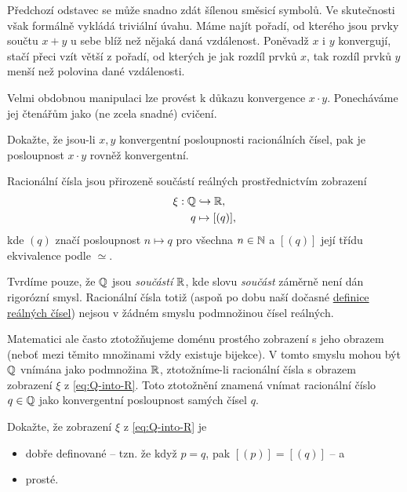 Předchozí odstavec se může snadno zdát šílenou směsicí symbolů. Ve skutečnosti
však formálně vykládá triviální úvahu. Máme najít pořadí, od kterého jsou prvky
součtu $x + y$ u sebe blíž než nějaká daná vzdálenost. Poněvadž $x$ i $y$
konvergují, stačí přeci vzít větší z pořadí, od kterých je jak rozdíl prvků $x$,
tak rozdíl prvků $y$ menší než polovina dané vzdálenosti.

Velmi obdobnou manipulaci lze provést k důkazu konvergence $x \cdot y$.
Ponecháváme jej čtenářům jako (ne zcela snadné) cvičení.

\begin{exercise}{}{}
 Dokažte, že jsou-li $x,y$ konvergentní posloupnosti racionálních čísel, pak je
 posloupnost $x \cdot y$ rovněž konvergentní.
\end{exercise}

Racionální čísla jsou přirozeně součástí reálných prostřednictvím zobrazení
\begin{equation}
 \label{eq:Q-into-R}
 \begin{split}
  \xi: \mathbb{Q} &\hookrightarrow \mathbb{R},\\
  q &\mapsto [(q)],
 \end{split}
\end{equation}
kde $(q)$ značí posloupnost $n \mapsto q$ pro všechna $n \in \mathbb{N}$ a $[(q)]$ její
třídu ekvivalence podle $ \simeq $.

\begin{warning}{}{}
 Tvrdíme pouze, že $\mathbb{Q}$ jsou \emph{součástí} $\mathbb{R}$, kde slovu \emph{součást}
 záměrně není dán rigorózní smysl. Racionální čísla totiž (aspoň po dobu naší
 dočasné \hyperref[def:realna-cisla]{definice reálných čísel}) nejsou v žádném
 smyslu podmnožinou čísel reálných.

 Matematici ale často ztotožňujeme doménu prostého zobrazení s jeho obrazem
 (neboť mezi těmito množinami vždy existuje bijekce). V tomto smyslu mohou být
 $\mathbb{Q}$ vnímána jako podmnožina $\mathbb{R}$, ztotožníme-li racionální čísla s obrazem
 zobrazení $\xi$ z \eqref{eq:Q-into-R}. Toto ztotožnění znamená vnímat
 racionální číslo $q \in \mathbb{Q}$ jako konvergentní posloupnost samých čísel $q$.
\end{warning}

\begin{exercise}{}{}
 Dokažte, že zobrazení $\xi$ z \eqref{eq:Q-into-R} je
 \begin{itemize}
  \item dobře definované -- tzn. že když $p = q$, pak $[(p)] = [(q)]$ -- a
  \item prosté.
 \end{itemize}
\end{exercise}


